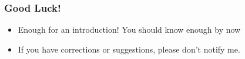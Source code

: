 \begin{frame}
\frametitle{Good Luck!}
\begin{itemize}
\item Enough for an introduction! You should know enough by now
\item If you have corrections or suggestions, please don't notify me.
\end{itemize}
\end{frame}

